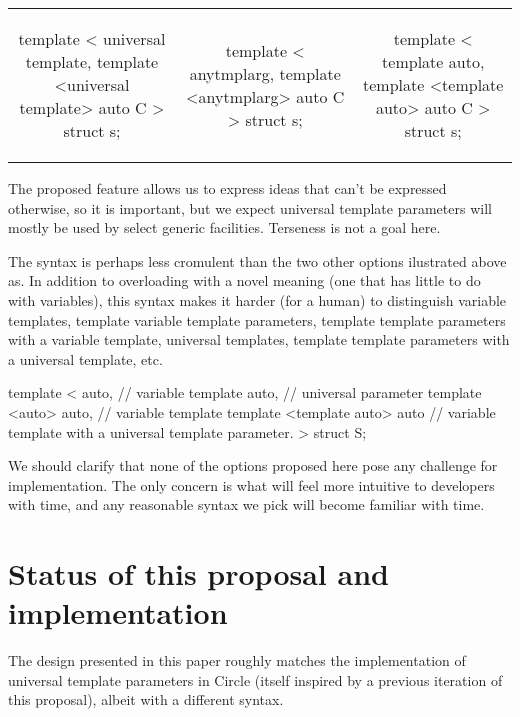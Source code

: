 \documentclass{wg21}
\begin{document}
\begin{table}
\tiny
\hspace{-30pt}
\begin{tabular}{c | c | c}
\begin{colorblock}
template <
  universal template,
  template <universal template> auto C
>
struct s;
\end{colorblock}
&
\begin{colorblock}
template <
  anytmplarg,
  template <anytmplarg> auto C
>
struct s;
\end{colorblock}
&
\begin{colorblock}
template <
  template auto,
  template <template auto> auto C
>
struct s;
\end{colorblock}
\end{tabular}
\end{table}


The proposed feature allows us to express ideas that can't be expressed otherwise, so it is important,
but we expect universal template parameters will mostly be used by select generic facilities. Terseness is not a goal here.

The  syntax is perhaps less cromulent than the two other options ilustrated above as. In addition to overloading
 with a novel meaning (one that has little to do with variables), this syntax makes it harder (for a human) to distinguish
variable templates, template variable template parameters, template template parameters with a variable template, universal templates,
template template parameters with a universal template, etc.

\begin{colorblock}
template <
   auto, // variable
   template auto, // universal parameter
   template <auto> auto, // variable template
   template <template auto> auto // variable template with a universal template parameter.
>
struct S;
\end{colorblock}


We should clarify that none of the options proposed here pose any challenge for implementation. The only concern is what will feel more intuitive to
developers with time, and any reasonable syntax we pick will become familiar with time.


\section{Status of this proposal and implementation}

The design presented in this paper roughly matches the implementation of universal template parameters in Circle (itself inspired by a previous iteration of this proposal),
albeit with a different syntax.
\end{document}
